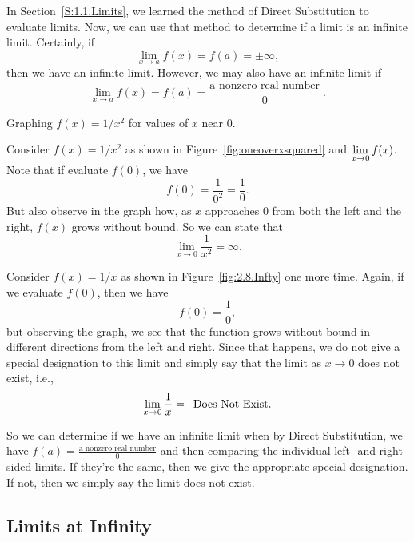 In Section~\ref{S:1.1.Limits}, we learned the method of Direct Substitution to evaluate limits.  Now, we can use that method to determine if a limit is an infinite limit.  Certainly, if
\[ \lim_{x \to a} f(x) = f(a) = \pm \infty, \]
then we have an infinite limit.  However, we may also have an infinite limit if
\[ \lim_{x \to a} f(x) = f(a) = \frac{\mbox{a nonzero real number}}{0} \ . \]

\begin{marginfigure} %
\caption{Graphing $f(x) = 1/x^2$ for values of $x$ near 0.}\label{fig:oneoverxsquared}
\end{marginfigure}

Consider $f(x) = 1/x^2$ as shown in Figure~\ref{fig:oneoverxsquared} and $\displaystyle \lim_{x \to 0} f(x)$. Note that if evaluate $f(0)$, we have
\[ f(0) = \frac{1}{0^2} = \frac{1}{0}. \]
But also observe in the graph how, as $x$ approaches $0$ from both the left and the right, $f(x)$ grows without bound. So we can state that 
\[ \lim_{x \to 0} \frac{1}{x^2}=\infty.\]

Consider $f(x) = 1/x$ as shown in Figure~\ref{fig:2.8.Infty} one more time.  Again, if we evaluate $f(0)$, then we have
\[ f(0) = \frac{1}{0}, \]
but observing the graph, we see that the function grows without bound in different directions from the left and right.  Since that happens, we do not give a special designation to this limit and simply say that the limit as $x \to 0$ does not exist, i.e.,
\[ \lim_{x \to 0} \frac{1}{x} = \enskip \mbox{Does Not Exist.} \]

So we can determine if we have an infinite limit when by Direct Substitution, we have $f(a) = \frac{\mbox{a nonzero real number}}{0}$ and then comparing the individual left- and right-sided limits.  If they're the same, then we give the appropriate special designation.  If not, then we simply say the limit does not exist.




\subsection{Limits at Infinity}

